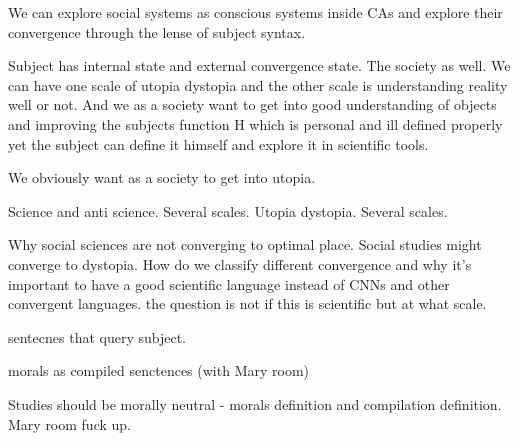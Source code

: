 We can explore social systems as conscious systems inside CAs and explore their convergence through the lense of subject syntax. 

Subject has internal state and external convergence state.  The society as well. We can have one scale of utopia dystopia and the other scale is understanding reality well or not. And we as a society want to get into good understanding of objects and improving the subjects function H which is personal and ill defined properly yet the subject can define it himself and explore it in scientific tools. 

We obviously want as a society to get into utopia. 

Science and anti science. Several scales. 
Utopia dystopia. Several scales. 

Why social sciences are not converging to optimal place. Social studies might converge to dystopia. How do we classify different convergence and why it's important to have a good scientific language instead of CNNs and other convergent languages. the question is not if this is scientific but at what scale. 

sentecnes that query subject. 

morals as compiled senctences (with Mary room)

Studies should be morally neutral - morals definition and compilation definition. Mary room fuck up. 